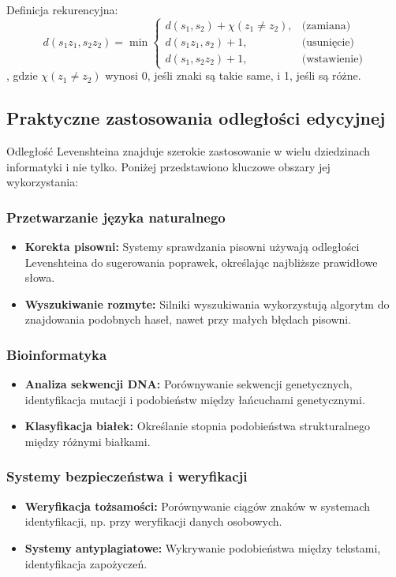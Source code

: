 Definicja rekurencyjna:
\[
    d(s_1z_1, s_2z_2) = \min 
    \begin{cases} 
        d(s_1, s_2) + \chi(z_1 \neq z_2), & \text{(zamiana)} \\ 
        d(s_1z_1, s_2) + 1, & \text{(usunięcie)} \\ 
        d(s_1, s_2z_2) + 1, & \text{(wstawienie)} 
    \end{cases}
\]
, gdzie \(\chi(z_1 \neq z_2)\) wynosi 0, jeśli znaki są takie same, i 1, jeśli są różne.

\subsection{Praktyczne zastosowania odległości edycyjnej}
Odległość Levenshteina znajduje szerokie zastosowanie w wielu dziedzinach informatyki i nie tylko. Poniżej przedstawiono kluczowe obszary jej wykorzystania:

\subsubsection*{Przetwarzanie języka naturalnego}
\begin{itemize}
    \item \textbf{Korekta pisowni:} Systemy sprawdzania pisowni używają odległości Levenshteina do sugerowania poprawek, określając najbliższe prawidłowe słowa.
    \item \textbf{Wyszukiwanie rozmyte:} Silniki wyszukiwania wykorzystują algorytm do znajdowania podobnych haseł, nawet przy małych błędach pisowni.
\end{itemize}

\subsubsection*{Bioinformatyka}
\begin{itemize}
    \item \textbf{Analiza sekwencji DNA:} Porównywanie sekwencji genetycznych, identyfikacja mutacji i podobieństw między łańcuchami genetycznymi.
    \item \textbf{Klasyfikacja białek:} Określanie stopnia podobieństwa strukturalnego między różnymi białkami.
\end{itemize}

\subsubsection*{Systemy bezpieczeństwa i weryfikacji}
\begin{itemize}
    \item \textbf{Weryfikacja tożsamości:} Porównywanie ciągów znaków w systemach identyfikacji, np. przy weryfikacji danych osobowych.
    \item \textbf{Systemy antyplagiatowe:} Wykrywanie podobieństwa między tekstami, identyfikacja zapożyczeń.
\end{itemize}

